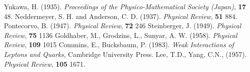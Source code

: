 \documentclass[a4paper,12pt]{book}
\begin{document}
\begin{thebibliography}{widest-label}
      Yukawa, H. (1935). \emph{Proceedings of the Physico-Mathematical Society (Japan)}, \textbf{17} 48.
      Neddermeyer, S. H. and Anderson, C. D. (1937). \emph{Physical Review}, \textbf{51} 884.
      Pontecorvo, B. (1947). \emph{Physical Review}, \textbf{72} 246
      Steinberger, J. (1949). \emph{Physical Review}, \textbf{75} 1136
      Goldhaber, M., Grodzins, L., Sunyar, A. W. (1958). \emph{Physical Review}, \textbf{109} 1015
      Commins, E., Bucksbaum, P. (1983). \emph{Weak Interactions of Leptons and Quarks}, Cambridge University Press.
      Lee, T.D., Yang, C.N., (1957). \emph{Physical Review}, \textbf{105} 1671.
\end{thebibliography}
\end{document}
